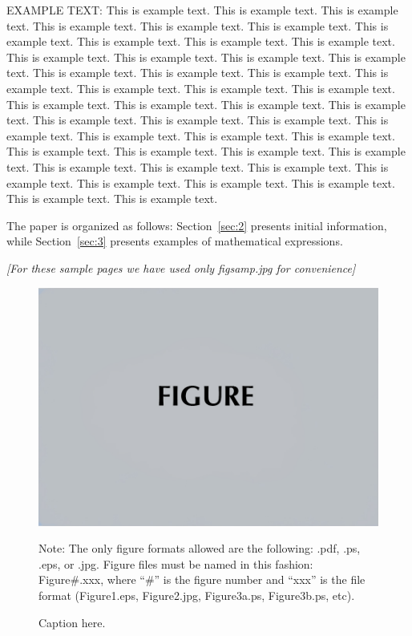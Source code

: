 \documentclass[reprint]{JASAnew}
\begin{document}
EXAMPLE TEXT: This is example text. This is example text. This is example text. This is example text. This is example text. This is example text. This is example text. This is example text. This is example text. This is example text. This is example text. This is example text. This is example text. This is example text. This is example text. This is example text. This is example text. This is example text. This is example text. This is example text. This is example text. This is example text. This is example text. This is example text. This is example text. This is example text. This is example text. This is example text. This is example text. This is example text. This is example text. This is example text. This is example text. This is example text. This is example text. This is example text. This is example text. This is example text. This is example text. This is example text. This is example text. This is example text. This is example text. This is example text. This is example text. 

The paper is organized as follows: Section~\ref{sec:2} presents
initial information, while
Section~\ref{sec:3} presents examples of mathematical expressions.

{\it
[For these sample pages we have used only figsamp.jpg for
convenience]}

 
 
\begin{figure}[ht]
\includegraphics[width=\reprintcolumnwidth]{figsamp.jpg}
\caption{\label{fig:FIG1}{Caption here.}}

\raggedright
Note: The only figure formats allowed are the following: 
.pdf, .ps, .eps, or .jpg. Figure files must be named in this fashion:
Figure\#.xxx, where ``\#'' is the figure number and ``xxx'' is the file format
(Figure1.eps, Figure2.jpg, Figure3a.ps, Figure3b.ps, etc). 
\end{figure}
\vskip-24pt
\vskip1sp
\end{document}
